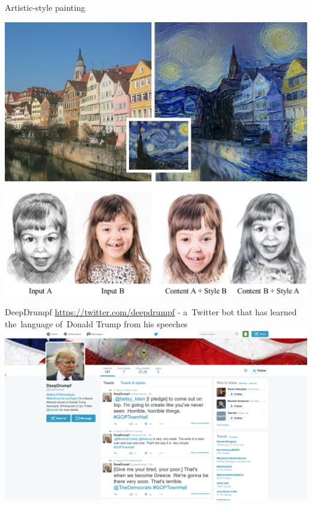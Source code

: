 \documentclass{beamer}
\begin{document}
  {
    \begin{frame}{Artistic-style painting}
      \begin{center}
        \includegraphics[height=.4\textheight]{../img/art_Van_Gogh.jpg}
        \pause

        \includegraphics[height=.44\textheight]{../img/art_girl.png}
      \end{center}
    \end{frame}
  }

  {
    \begin{frame}{DeepDrumpf}
      \url{https://twitter.com/deepdrumpf}
      \pause
      - a~Twitter bot that has learned the~language of~Donald Trump from his speeches 
      \includegraphics[width=\textwidth]{../img/DeepDrumpf.png}
    \end{frame}
  }
\end{document}
